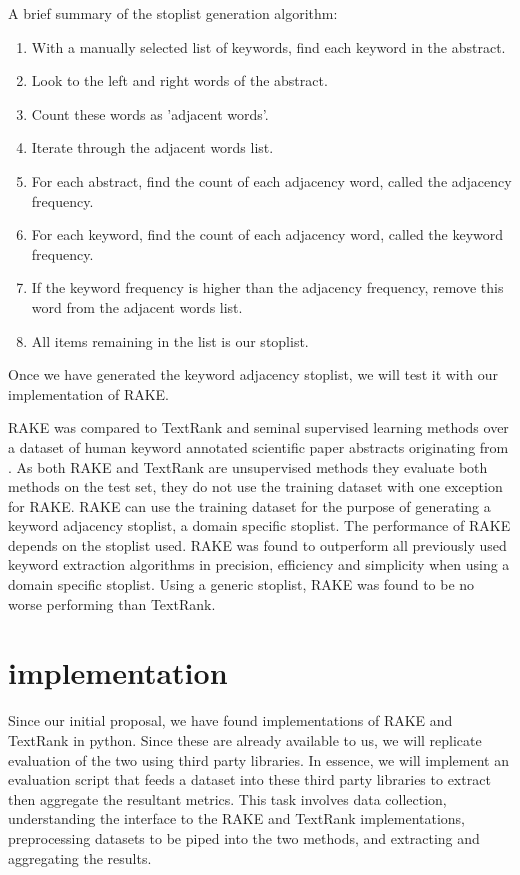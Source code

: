 \documentclass[11pt,a4paper]{article}
\begin{document}
A brief summary of the stoplist generation algorithm:
\begin{enumerate}
	\item With a manually selected list of keywords, find each keyword in the abstract.
	\item Look to the left and right words of the abstract.
	\item Count these words as 'adjacent words'.
	\item Iterate through the adjacent words list.
	\item For each abstract, find the count of each adjacency word, called the adjacency frequency.
	\item For each keyword, find the count of each adjacency word, called the keyword frequency.
	\item If the keyword frequency is higher than the adjacency frequency, remove this word from the adjacent words list.
	\item All items remaining in the list is our stoplist. 
\end{enumerate}

Once we have generated the keyword adjacency stoplist, we will test it with our implementation of RAKE.

RAKE was compared to TextRank and seminal supervised learning methods \citep{hulth-2003-improved} over a dataset of human keyword annotated scientific paper abstracts originating from \citet{hulth-2003-improved}. As both RAKE and TextRank are unsupervised methods they evaluate both methods on the test set, they do not use the training dataset with one exception for RAKE. RAKE can use the training dataset for the purpose of generating a keyword adjacency stoplist, a domain specific stoplist. The performance of RAKE depends on the stoplist used. RAKE was found to outperform all previously used keyword extraction algorithms in precision, efficiency and simplicity when using a domain specific stoplist. Using a generic stoplist, RAKE was found to be no worse performing than TextRank.

\section{implementation}
Since our initial proposal, we have found implementations of RAKE and TextRank in python. Since these are already available to us, we will replicate  evaluation of the two using third party libraries.  In essence, we will implement an evaluation script that feeds a dataset into these third party libraries to extract then aggregate the resultant metrics. This task involves data collection, understanding the interface to the RAKE and TextRank implementations, preprocessing datasets to be piped into the two methods, and extracting and aggregating the results.
\end{document}
